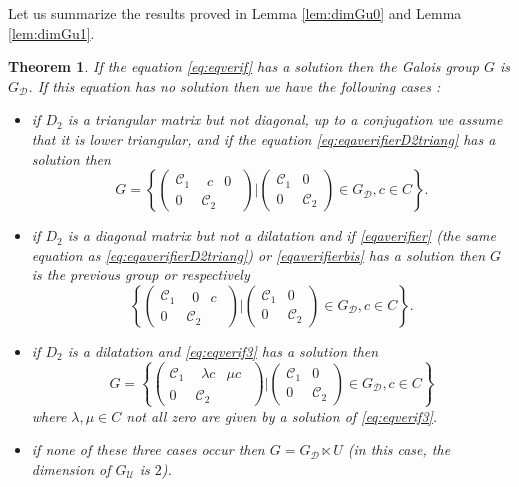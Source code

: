 \documentclass[a4paper,11pt]{amsart}
\newcommand{\Gdiag}{G_{\mathcal{D}}}
\newcommand{\Gunip}{G_{\mathcal{U}}}
\newtheorem{thm}{Theorem}[section]
\begin{document}
Let us summarize the results proved in Lemma \ref{lem:dimGu0} and Lemma \ref{lem:dimGu1}. 

\begin{thm}
\label{thm:reduc_systcomplet}
If the equation \eqref{eq:eqverif} has a solution then the Galois group $G$ is $\Gdiag$. If this equation has no solution then we have the following cases :
\begin{itemize}
    \item if $D_2$ is a triangular matrix but not diagonal, up to a conjugation we assume that it is lower triangular, and if the equation \eqref{eq:eqaverifierD2triang} has a solution then $$G = \left\{ \begin{pmatrix}
\mathscr{C}_1& \begin{matrix} c&0 \end{matrix} \\ 
0 & \mathscr{C}_2
\end{pmatrix}\Bigg|   \begin{pmatrix}
\mathscr{C}_1& 0 \\ 
0 & \mathscr{C}_2
\end{pmatrix} \in \Gdiag,   c\in C \right\}.
$$ 
    \item if $D_2$ is a diagonal matrix but not a dilatation and if \eqref{eqaverifier} (the same equation as \eqref{eq:eqaverifierD2triang})  or \eqref{eqaverifierbis} has a solution then $G$ is the previous group or respectively $$ \left\{ \begin{pmatrix}
\mathscr{C}_1& \begin{matrix} 0&c \end{matrix} \\ 
0 & \mathscr{C}_2
\end{pmatrix}\Bigg|   \begin{pmatrix}
\mathscr{C}_1& 0 \\ 
0 & \mathscr{C}_2
\end{pmatrix} \in \Gdiag,   c\in C \right\}.
$$ 
    \item if $D_2$ is a dilatation and \eqref{eq:eqverif3} has a solution then $$G = \left\{ \begin{pmatrix}
\mathscr{C}_1& \begin{matrix} \lambda c&\mu c\end{matrix} \\ 
0 & \mathscr{C}_2
\end{pmatrix}\Bigg|   \begin{pmatrix}
\mathscr{C}_1& 0 \\ 
0 & \mathscr{C}_2
\end{pmatrix} \in \Gdiag,   c\in C \right\} 
$$  where $\lambda, \mu\in C$ not all zero are given by a solution of \eqref{eq:eqverif3}. 
    \item if none of these three cases occur then $G=\Gdiag\ltimes U$ (in this case, the dimension of $\Gunip$ is $2$).
\end{itemize}
\end{thm}
\end{document}
